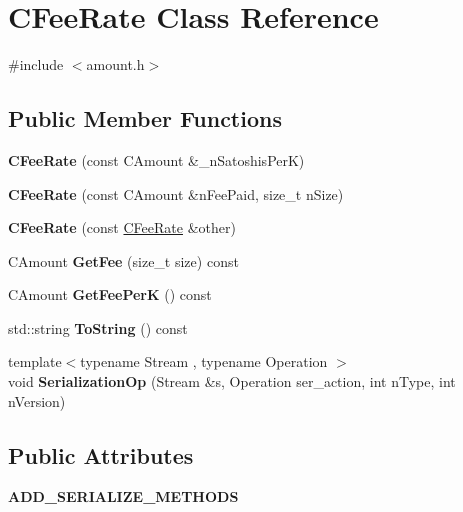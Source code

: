 \hypertarget{class_c_fee_rate}{}\section{C\+Fee\+Rate Class Reference}
\label{class_c_fee_rate}


{\ttfamily \#include $<$amount.\+h$>$}

\subsection*{Public Member Functions}
\begin{DoxyCompactItemize}
\item 
\mbox{\label{class_c_fee_rate_abee4364fc0d83612feda7c9f5425a7cc}} 
{\bfseries C\+Fee\+Rate} (const C\+Amount \&\+\_\+n\+Satoshis\+PerK)
\item 
\mbox{\label{class_c_fee_rate_ad92ea084b8fa9495cbfe0da9cfd1cd69}} 
{\bfseries C\+Fee\+Rate} (const C\+Amount \&n\+Fee\+Paid, size\+\_\+t n\+Size)
\item 
\mbox{\label{class_c_fee_rate_aa82ca8ba290a1c02ed522aacfb5105ef}} 
{\bfseries C\+Fee\+Rate} (const \mbox{\hyperlink{class_c_fee_rate}{C\+Fee\+Rate}} \&other)
\item 
\mbox{\label{class_c_fee_rate_a6a3aef64120ef51ac921318282404b0e}} 
C\+Amount {\bfseries Get\+Fee} (size\+\_\+t size) const
\item 
\mbox{\label{class_c_fee_rate_ac772be79983433d442d6b871d2fb6e11}} 
C\+Amount {\bfseries Get\+Fee\+PerK} () const
\item 
\mbox{\label{class_c_fee_rate_a67a2711583d588edd3dfa2dba682f4ce}} 
std\+::string {\bfseries To\+String} () const
\item 
\mbox{\label{class_c_fee_rate_aface850a2c1af316cedf87d24f04fda3}} 
{\footnotesize template$<$typename Stream , typename Operation $>$ }\\void {\bfseries Serialization\+Op} (Stream \&s, Operation ser\+\_\+action, int n\+Type, int n\+Version)
\end{DoxyCompactItemize}
\subsection*{Public Attributes}
\begin{DoxyCompactItemize}
\item 
\mbox{\label{class_c_fee_rate_ab1030f8a059eb5ccade1e3803bd727b3}} 
{\bfseries A\+D\+D\+\_\+\+S\+E\+R\+I\+A\+L\+I\+Z\+E\+\_\+\+M\+E\+T\+H\+O\+DS}
\end{DoxyCompactItemize}
